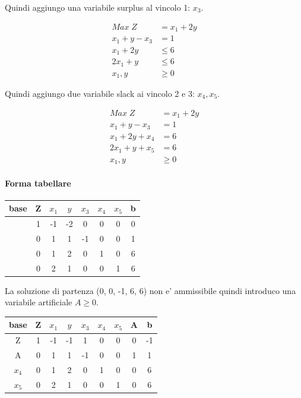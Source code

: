 \documentclass[a4paper,12pt,oneside]{article}
\begin{document}
    Quindi aggiungo una variabile surplus al vincolo 1: $x_3$.

    \begin{align*}
        Max \; Z &= x_1 + 2 y \\
        x_1 + y - x_3 & = 1 \\
        x_1 + 2 y & \leq 6 \\
        2 x_1 + y & \leq 6 \\
        x_1, y & \geq 0
    \end{align*}

    Quindi aggiungo due variabile slack ai vincolo 2 e 3: $x_4, x_5$.

    \begin{align*}
        Max \; Z &= x_1 + 2 y \\
        x_1 + y - x_3 & = 1 \\
        x_1 + 2 y + x_4 & = 6 \\
        2 x_1 + y + x_5 & = 6 \\
        x_1, y & \geq 0
    \end{align*}

    \paragraph{Forma tabellare}

    \begin{center}
        \begin{tabular}{||c c c c c c c c||}
            \hline
            base & Z & $x_1$ & $y$ & $x_3$ & $x_4$ & $x_5$ & b \\
            \hline
            \hline
            & 1 & -1 & -2 &  0 & 0 & 0 & 0 \\
            \hline
            & 0 &  1 &  1 & -1 & 0 & 0 & 1 \\
            \hline
            & 0 &  1 &  2 &  0 & 1 & 0 & 6 \\
            \hline
            & 0 &  2 &  1 &  0 & 0 & 1 & 6 \\
            \hline
        \end{tabular}
    \end{center}

    La soluzione di partenza (0, 0, -1, 6, 6) non e' ammissibile quindi introduco una variabile artificiale $A \geq 0$.

    \begin{center}
        \begin{tabular}{||c c c c c c c c c||}
            \hline
            base & Z & $x_1$ & $y$ & $x_3$ & $x_4$ & $x_5$ & A & b \\
            \hline
            \hline
            Z     & 1 & -1 & -1 &  1 & 0 & 0 & 0 & -1 \\
            \hline
            A     & 0 &  1 &  1 & -1 & 0 & 0 & 1 &  1 \\
            \hline
            $x_4$ & 0 &  1 &  2 &  0 & 1 & 0 & 0 &  6 \\
            \hline
            $x_5$ & 0 &  2 &  1 &  0 & 0 & 1 & 0 &  6 \\
            \hline
        \end{tabular}
    \end{center}
\end{document}
